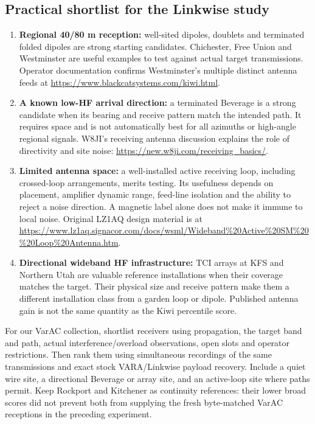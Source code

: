 \documentclass[11pt,a4paper]{article}
\begin{document}
\subsection{Practical shortlist for the Linkwise study}
\begin{enumerate}[leftmargin=*]
  \item \textbf{Regional 40/80 m reception:} well-sited dipoles, doublets
        and terminated folded dipoles are strong starting candidates.
        Chichester, Free Union and Westminster are useful examples to test
        against actual target transmissions. Operator documentation confirms
        Westminster's multiple distinct antenna feeds at
        \url{https://www.blackcatsystems.com/kiwi.html}.
  \item \textbf{A known low-HF arrival direction:} a terminated Beverage
        is a strong candidate when its bearing and receive pattern match
        the intended path. It requires space and is not automatically best
        for all azimuths or high-angle regional signals. W8JI's receiving
        antenna discussion explains the role of directivity and site noise:
        \url{https://new.w8ji.com/receiving_basics/}.
  \item \textbf{Limited antenna space:} a well-installed active receiving
        loop, including crossed-loop arrangements, merits testing. Its
        usefulness depends on placement, amplifier dynamic range, feed-line
        isolation and the ability to reject a noise direction. A magnetic
        label alone does not make it immune to local noise. Original LZ1AQ
        design material is at
        \url{https://www.lz1aq.signacor.com/docs/wsml/Wideband\%20Active\%20SM\%20\%20Loop\%20Antenna.htm}.
  \item \textbf{Directional wideband HF infrastructure:} TCI arrays at
        KFS and Northern Utah are valuable reference installations when
        their coverage matches the target. Their physical size and receive
        pattern make them a different installation class from a garden loop
        or dipole. Published antenna gain is not the same quantity as the
        Kiwi percentile score.
\end{enumerate}

For our VarAC collection, shortlist receivers using propagation, the target
band and path, actual interference/overload observations, open slots and
operator restrictions. Then rank them using simultaneous recordings of the
same transmissions and exact stock VARA/Linkwise payload recovery. Include a
quiet wire site, a directional Beverage or array site, and an active-loop
site where paths permit. Keep Rockport and Kitchener as continuity references:
their lower broad scores did not prevent both from supplying the fresh
byte-matched VarAC receptions in the preceding experiment.
\end{document}
